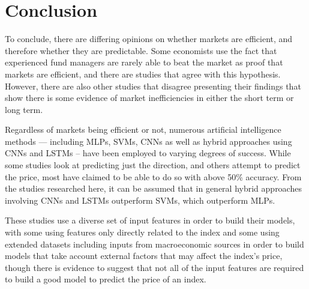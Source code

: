 \section{Conclusion}
To conclude, there are differing opinions on whether markets are efficient, and therefore whether they are predictable. Some economists use the fact that experienced fund managers are rarely able to beat the market as proof that markets are efficient, and there are studies that agree with this hypothesis. However, there are also other studies that disagree presenting their findings that show there is some evidence of market inefficiencies in either the short term or long term.

Regardless of markets being efficient or not, numerous artificial intelligence methods — including MLPs, SVMs, CNNs as well as hybrid approaches using CNNs and LSTMs -- have been employed to varying degrees of success. While some studies look at predicting just the direction, and others attempt to predict the price, most have claimed to be able to do so with above 50\% accuracy. From the studies researched here, it can be assumed that in general hybrid approaches involving CNNs and LSTMs outperform SVMs, which outperform MLPs.

These studies use a diverse set of input features in order to build their models, with some using features only directly related to the index and some using extended datasets including inputs from macroeconomic sources in order to build models that take account external factors that may affect the index's price, though there is evidence to suggest that not all of the input features are required to build a good model to predict the price of an index.
